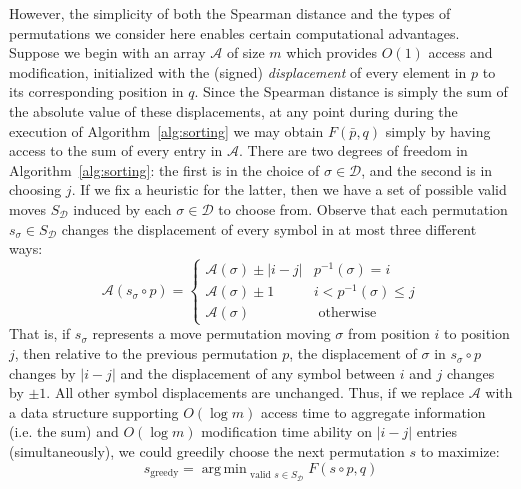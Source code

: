 \documentclass[sn-mathphys]{sn-jnl}
\DeclareMathOperator*{\argmin}{arg\,min}
\begin{document}
However, the simplicity of both the Spearman distance and the types of permutations we consider here enables certain computational advantages. Suppose we begin with an array $\mathcal{A}$ of size $m$ which provides $O(1)$ access and modification, initialized with the (signed) \emph{displacement} of every element in $p$ to its corresponding position in $q$. Since the Spearman distance is simply the sum of the absolute value of these displacements, at any point during during the execution of Algorithm~\ref{alg:sorting} we may obtain $F(\bar{p}, q)$ simply by having access to the sum of every entry in $\mathcal{A}$. There are two degrees of freedom in   Algorithm~\ref{alg:sorting}: the first is in the choice of $\sigma \in \mathcal{D}$, and the second is in choosing $j$. If we fix a heuristic for the latter, then we have a set of possible valid moves $S_\mathcal{D}$ induced by each $\sigma \in \mathcal{D}$ to choose from. Observe that each permutation $s_\sigma \in S_\mathcal{D}$ changes the displacement of every symbol in at most three different ways: 
\[
\mathcal{A}(s_\sigma \circ p) = 
\begin{cases} 
	 \mathcal{A}(\sigma) \pm \lvert i - j \rvert & p^{-1}(\sigma) = i \\
	 \mathcal{A}(\sigma) \pm 1 & i < p^{-1}(\sigma) \leq j \\
	 \mathcal{A}(\sigma) & \text{ otherwise }
\end{cases}
\]
That is, if $s_\sigma$ represents a move permutation moving $\sigma$ from position $i$ to position $j$, then relative to the previous permutation $p$, the displacement of $\sigma$ in $s_\sigma \circ p$ changes by $\lvert i - j \rvert$ and the displacement of any symbol between $i$ and $j$ changes by $\pm 1$. 
All other symbol displacements are unchanged. Thus, if we replace $\mathcal{A}$ with a data structure  supporting $O(\log m)$ access time to aggregate information (i.e. the sum) and $O(\log m)$ modification time ability on $\lvert i - j \vert$ entries (simultaneously), we could greedily choose the next permutation $s$ to maximize:
\begin{equation}\label{eq:greedy_step}
	s_{\text{greedy}} = \argmin_{\text{ valid } s \in S_\mathcal{D}} F(s\circ p, q)
\end{equation}  
\end{document}
